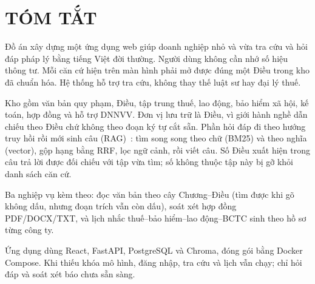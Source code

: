 \vspace{0.85cm}
\noindent\makebox[\linewidth]{\dotfill}

\vspace{0.85cm}
\noindent\makebox[\linewidth]{\dotfill}

\vspace{0.85cm}
\noindent\makebox[\linewidth]{\dotfill}

\vspace{0.85cm}
\noindent\makebox[\linewidth]{\dotfill}

\vspace{0.85cm}
\noindent\makebox[\linewidth]{\dotfill}

\vspace{0.85cm}
\noindent\makebox[\linewidth]{\dotfill}

\vspace{0.85cm}
\noindent\makebox[\linewidth]{\dotfill}

\clearpage

\chapter*{TÓM TẮT}

Đồ án xây dựng một ứng dụng web giúp doanh nghiệp nhỏ và vừa tra cứu và hỏi đáp
pháp lý bằng tiếng Việt đời thường. Người dùng không cần nhớ số hiệu thông tư.
Mỗi căn cứ hiện trên màn hình phải mở được đúng một Điều trong kho đã chuẩn hóa.
Hệ thống hỗ trợ tra cứu, không thay thế luật sư hay đại lý thuế.

Kho gồm \soLuat{} văn bản quy phạm, \soDieu{} Điều, tập trung thuế, lao động,
bảo hiểm xã hội, kế toán, hợp đồng và hỗ trợ DNNVV. Đơn vị lưu trữ là Điều, vì
giới hành nghề dẫn chiếu theo Điều chứ không theo đoạn ký tự cắt sẵn. Phần hỏi
đáp đi theo hướng truy hồi rồi mới sinh câu (RAG)~\cite{lewis2020rag}: tìm song
song theo chữ (BM25) và theo nghĩa (vector), gộp hạng bằng RRF, lọc ngữ cảnh,
rồi viết câu. Số Điều xuất hiện trong câu trả lời được đối chiếu với tập vừa
tìm; số không thuộc tập này bị gỡ khỏi danh sách căn cứ.

Ba nghiệp vụ kèm theo: đọc văn bản theo cây Chương--Điều (tìm được khi gõ không
dấu, nhưng đoạn trích vẫn còn dấu), soát xét hợp đồng PDF/DOCX/TXT, và lịch
nhắc thuế--bảo hiểm--lao động--BCTC sinh theo hồ sơ từng công ty.

Ứng dụng dùng React, FastAPI, PostgreSQL và Chroma, đóng gói bằng Docker
Compose. Khi thiếu khóa mô hình, đăng nhập, tra cứu và lịch vẫn chạy; chỉ hỏi
đáp và soát xét báo chưa sẵn sàng.


